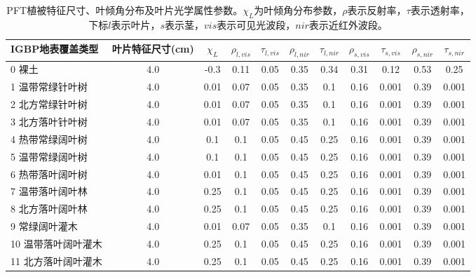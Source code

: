 \begin{sidewaystable}[]
    \centering
    \caption{PFT植被特征尺寸、叶倾角分布及叶片光学属性参数。$\chi_L$为叶倾角分布参数，$\rho$表示反射率，$\tau$表示透射率，下标$l$表示叶片，$s$表示茎，$vis$表示可见光波段，$nir$表示近红外波段。}
    \label{tab:PFT植被特征尺寸叶倾角分布及叶片光学属性参数1}
        \begin{tabular}{@{}lcccccccccc@{}}
        \toprule
        IGBP地表覆盖类型   & 叶片特征尺寸(cm) & $\chi_L$ &$\rho_{l, vis}$ & $\tau_{l, vis}$  &$\rho_{l, nir}$ &$\tau_{l, nir}$ & $\rho_{s, vis}$ &$\tau_{s, vis}$ &$\rho_{s, nir}$ &$\tau_{s,nir}$\\ \midrule
        0 裸土           & 4.0        & -0.3 & 0.11 & 0.05 & 0.35 & 0.34 & 0.31 & 0.12  & 0.53 & 0.25  \\
        1 温带常绿针叶树   & 4.0        & 0.01 & 0.07 & 0.05 & 0.35 & 0.1  & 0.16 & 0.001 & 0.39 & 0.001 \\
        2 北方常绿针叶树   & 4.0        & 0.01 & 0.07 & 0.05 & 0.35 & 0.1  & 0.16 & 0.001 & 0.39 & 0.001 \\
        3 北方落叶针叶树   & 4.0        & 0.01 & 0.07 & 0.05 & 0.35 & 0.1  & 0.16 & 0.001 & 0.39 & 0.001 \\
        4 热带常绿阔叶树   & 4.0        & 0.1  & 0.1  & 0.05 & 0.45 & 0.25 & 0.16 & 0.001 & 0.39 & 0.001 \\
        5 温带常绿阔叶树   & 4.0        & 0.1  & 0.1  & 0.05 & 0.45 & 0.25 & 0.16 & 0.001 & 0.39 & 0.001 \\
        6 热带落叶阔叶树   & 4.0        & 0.01 & 0.1  & 0.05 & 0.45 & 0.25 & 0.16 & 0.001 & 0.39 & 0.001 \\
        7 温带落叶阔叶林   & 4.0        & 0.25 & 0.1  & 0.05 & 0.45 & 0.25 & 0.16 & 0.001 & 0.39 & 0.001 \\
        8 北方落叶阔叶林   & 4.0        & 0.25 & 0.1  & 0.05 & 0.45 & 0.25 & 0.16 & 0.001 & 0.39 & 0.001 \\
        9 常绿阔叶灌木    & 4.0        & 0.01 & 0.07 & 0.05 & 0.35 & 0.1  & 0.16 & 0.001 & 0.39 & 0.001 \\
        10 温带落叶阔叶灌木 & 4.0        & 0.25 & 0.1  & 0.05 & 0.45 & 0.25 & 0.16 & 0.001 & 0.39 & 0.001 \\
        11 北方落叶阔叶灌木 & 4.0        & 0.25 & 0.1  & 0.05 & 0.45 & 0.25 & 0.16 & 0.001 & 0.39 & 0.001 \\ %

\end{tabular}
\end{sidewaystable}
